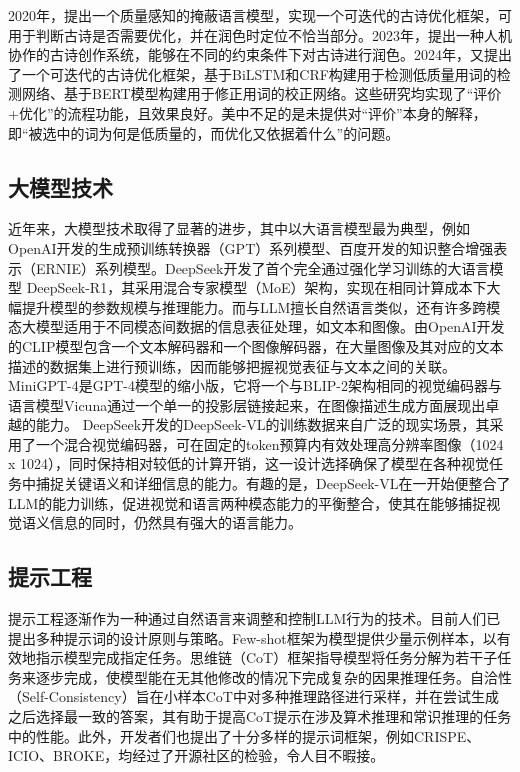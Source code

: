 2020年，\cite{dengIterativePolishingFramework2020}提出一个质量感知的掩蔽语言模型，实现一个可迭代的古诗优化框架，可用于判断古诗是否需要优化，并在润色时定位不恰当部分。2023年，\cite{maYuShengHumaninLoop2023}提出一种人机协作的古诗创作系统，能够在不同的约束条件下对古诗进行润色。2024年，\cite{chenPolishingModelMachineGenerated2024}又提出了一个可迭代的古诗优化框架，基于BiLSTM和CRF构建用于检测低质量用词的检测网络、基于BERT模型构建用于修正用词的校正网络。这些研究均实现了“评价+优化”的流程功能，且效果良好。美中不足的是未提供对“评价”本身的解释，即“被选中的词为何是低质量的，而优化又依据着什么”的问题。
\subsection{大模型技术}
近年来，大模型技术取得了显著的进步，其中以大语言模型最为典型，例如OpenAI开发的生成预训练转换器（GPT）系列模型、百度开发的知识整合增强表示（ERNIE）系列模型\cite{zhangERNIEEnhancedLanguage2019}。DeepSeek开发了首个完全通过强化学习训练的大语言模型 DeepSeek-R1\cite{deepseek-aiDeepSeekR1IncentivizingReasoning2025}，其采用混合专家模型（MoE）架构，实现在相同计算成本下大幅提升模型的参数规模与推理能力。而与LLM擅长自然语言类似，还有许多跨模态大模型适用于不同模态间数据的信息表征处理，如文本和图像。由OpenAI开发的CLIP模型包含一个文本解码器和一个图像解码器，在大量图像及其对应的文本描述的数据集上进行预训练，因而能够把握视觉表征与文本之间的关联。\cite{radfordLearningTransferableVisual2021}MiniGPT-4是GPT-4模型的缩小版，它将一个与BLIP-2架构相同的视觉编码器与语言模型Vicuna通过一个单一的投影层链接起来，在图像描述生成方面展现出卓越的能力。\cite{zhuMiniGPT4EnhancingVisionLanguage2023}
DeepSeek开发的DeepSeek-VL的训练数据来自广泛的现实场景，其采用了一个混合视觉编码器，可在固定的token预算内有效处理高分辨率图像（1024 x 1024），同时保持相对较低的计算开销，这一设计选择确保了模型在各种视觉任务中捕捉关键语义和详细信息的能力。有趣的是，DeepSeek-VL在一开始便整合了LLM的能力训练，促进视觉和语言两种模态能力的平衡整合，使其在能够捕捉视觉语义信息的同时，仍然具有强大的语言能力。\cite{luDeepSeekVLRealWorldVisionLanguage2024}

\subsection{提示工程}
提示工程逐渐作为一种通过自然语言来调整和控制LLM行为的技术。目前人们已提出多种提示词的设计原则与策略。Few-shot框架为模型提供少量示例样本，以有效地指示模型完成指定任务。\cite{brownLanguageModelsAre2020}思维链（CoT）框架指导模型将任务分解为若干子任务来逐步完成，使模型能在无其他修改的情况下完成复杂的因果推理任务。\cite{weiChainofThoughtPromptingElicits2022}自洽性（Self-Consistency）旨在小样本CoT中对多种推理路径进行采样，并在尝试生成之后选择最一致的答案，其有助于提高CoT提示在涉及算术推理和常识推理的任务中的性能。\cite{wangSelfConsistencyImprovesChain2023a}此外，开发者们也提出了十分多样的提示词框架，例如CRISPE、ICIO、BROKE，均经过了开源社区的检验，令人目不暇接。

